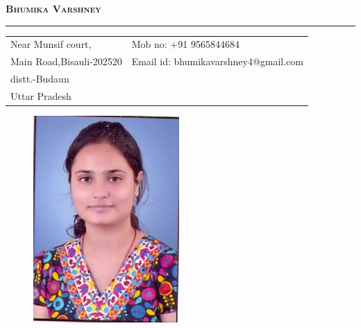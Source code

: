\documentclass{article}
\begin{document}
	\begin{center}
		\LARGE{\color{magenta}\textsc{\textbf{Bhumika Varshney}}
			\rule{\textwidth}{0.5mm}}
	\end{center}
	\begin{tabular}{l l}
		Near Munsif court, & \qquad\qquad\qquad\qquad\qquad\qquad Mob no: +91 9565844684 \\
		Main Road,Bisauli-202520 & \qquad\qquad\qquad\qquad\qquad\qquad Email id: bhumikavarshney4@gmail.com \\
		distt.-Budaun & \\
		Uttar Pradesh & \\
	\end{tabular}
	\begin{figure}[h]
		\begin{flushright}
			\includegraphics[scale=0.25]{bhumika.jpg}
		\end{flushright}		
	\end{figure}
\end{document}
